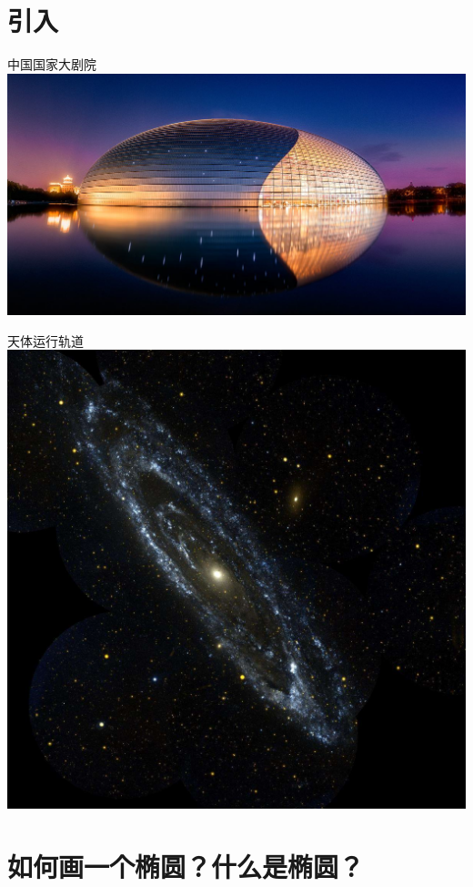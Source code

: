 \documentclass{beamer}
\begin{document}
    \section{引入}

    \begin{frame}{\qquad 中国国家大剧院}
      \includegraphics[scale=0.25]{e1.jpg}
    \end{frame}
    \begin{frame}{\qquad 天体运行轨道}
      \centering
      \includegraphics[scale=0.18]{e2.jpg}
    \end{frame}


    \section{如何画一个椭圆？什么是椭圆？}
\end{document}
